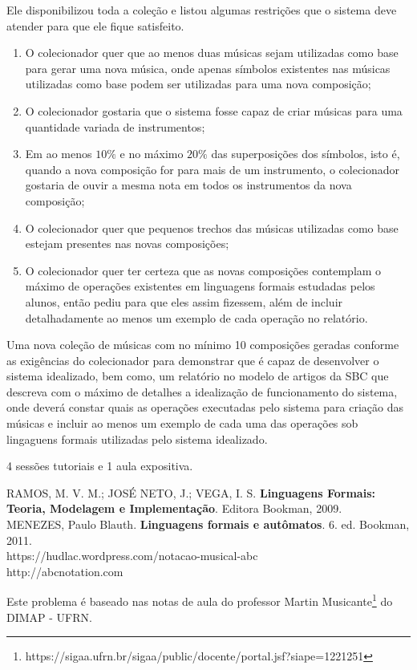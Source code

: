 Ele disponibilizou toda a coleção e listou algumas restrições que o sistema
deve atender para que ele fique satisfeito.

\begin{enumerate}
\item O colecionador quer que ao menos duas músicas sejam utilizadas como base para gerar uma nova música,
onde apenas símbolos existentes nas músicas utilizadas como base podem ser utilizadas para uma nova composição;
\item O colecionador gostaria que o sistema fosse capaz de criar músicas para uma quantidade variada de instrumentos;
\item Em ao menos $10\%$ e no máximo $20\%$ das superposições dos símbolos, isto é, quando a nova composição for para mais de um instrumento,
o colecionador gostaria de ouvir a mesma nota em todos os instrumentos da nova composição;
\item O colecionador quer que pequenos trechos das músicas utilizadas como base estejam
presentes nas novas composições;
\item O colecionador quer ter certeza que as novas composições contemplam o máximo
de operações existentes em linguagens formais estudadas pelos alunos, então pediu para
que eles assim fizessem, além de incluir detalhadamente ao menos um exemplo de cada operação
no relatório.
\end{enumerate}

Uma nova coleção de músicas com no mínimo 10 composições geradas conforme as exigências do colecionador
para demonstrar que é capaz de desenvolver o sistema idealizado, bem como, um relatório no modelo de
artigos da SBC que descreva com o máximo de detalhes a idealização de funcionamento do sistema, onde deverá
constar quais as operações executadas pelo sistema para criação das músicas e incluir ao menos
um exemplo de cada uma das operações sob lingaguens formais utilizadas pelo sistema idealizado.

4 sessões tutoriais e 1 aula expositiva.

RAMOS, M. V. M.; JOSÉ NETO, J.; VEGA, I. S. \textbf{Linguagens Formais: Teoria, Modelagem e Implementação}. Editora Bookman, 2009.\\

\noindent
MENEZES, Paulo Blauth. \textbf{Linguagens formais e autômatos}. 6. ed. Bookman, 2011.\\

\noindent
https://hudlac.wordpress.com/notacao-musical-abc\\

\noindent
http://abcnotation.com

Este problema é baseado nas notas de aula do professor Martin Musicante\footnote{\scriptsize{https://sigaa.ufrn.br/sigaa/public/docente/portal.jsf?siape=1221251}} do DIMAP - UFRN.
